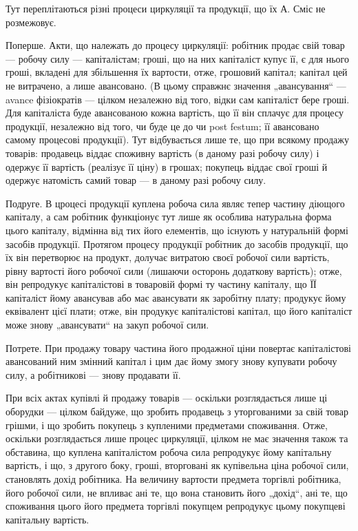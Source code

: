 Тут переплітаються різні процеси циркуляції та продукції, що їх А. Сміс не розмежовує.

Поперше. Акти, що належать до процесу циркуляції: робітник продає свій товар — робочу силу —
капіталістам; гроші, що на них капіталіст купує її, є для нього гроші, вкладені для збільшення їх
вартости, отже, грошовий капітал; капітал цей не витрачено, а лише авансовано. (В цьому справжнє
значення „авансування“ — avance фізіократів — цілком незалежно від того, відки сам капіталіст бере
гроші. Для капіталіста буде авансованою кожна вартість, що її він сплачує для процесу продукції,
незалежно від того, чи буде це до чи post festum; її авансовано самому процесові продукції). Тут
відбувається лише те, що при всякому продажу товарів: продавець віддає споживну вартість (в даному
разі робочу силу) і одержує її вартість (реалізує її ціну) в грошах; покупець віддає свої гроші й
одержує натомість самий товар — в даному разі робочу силу.

Подруге. В цроцесі продукції куплена робоча сила являє тепер частину діющого капіталу, а сам
робітник функціонує тут лише як особлива натуральна форма цього капіталу, відмінна від тих його
елементів, що існують у натуральній формі засобів продукції. Протягом процесу продукції робітник до
засобів продукції, що їх він перетворює на продукт, долучає витратою своєї робочої сили вартість,
рівну вартості його робочої
сили (лишаючи осторонь додаткову вартість); отже, він репродукує капіталістові в товаровій
формі ту частину капіталу, що ЇЇ капіталіст йому авансував або має авансувати як заробітну плату;
продукує йому еквівалент цієї плати; отже, він продукує капіталістові капітал, що його капіталіст
може знову „авансувати“ на закуп робочої сили.

Потрете. При продажу товару частина його продажної ціни повертає капіталістові авансований ним
змінний капітал і цим дає йому змогу знову купувати робочу силу, а робітникові — знову продавати її.

При всіх актах купівлі й продажу товарів — оскільки розглядається лише ці оборудки — цілком байдуже,
що зробить продавець з уторгованими за свій товар грішми, і що зробить покупець з купленими
предметами споживання. Отже, оскільки розглядається лише процес циркуляції, цілком не має значення
також та обставина, що куплена капіталістом робоча сила репродукує йому капітальну вартість, і що, з
другого боку,
гроші, вторговані як купівельна ціна робочої сили, становлять дохід робітника. На величину вартости
предмета торгівлі робітника, його робочої сили, не впливає ані те, що вона становить його „дохід“,
ані те, що споживання цього його предмета торгівлі покупцем репродукує цьому покупцеві капітальну
вартість.

